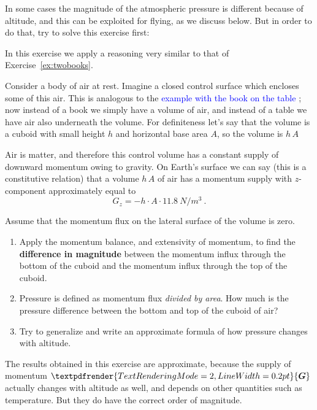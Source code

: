 \documentclass[a4paper,12pt,%
onecolumn,oneside,%
british%
]{memoir}
\renewcommand*{\bm}[1]{\textpdfrender{TextRenderingMode=2,LineWidth=0.2pt}{\boldsymbol{#1}}}
\renewcommand*{\|}[1][]{\nonscript\:#1\vert\nonscript\:\mathopen{}}
\newcommand*{\sect}{\S}%
\renewcommand*{\autoref}[3][\sect\,\ref]{\textcolor{blue}{#3}
\raisebox{0.6ex}{\color{blue}\miniscule%
\faIcon{angle-right}%
\;#1{#2}\;p.\,\pageref{#2}}}
\newcommand*{\yG}{\bm{G}}
\begin{document}
In some cases the magnitude of the atmospheric pressure is different because of altitude, and this can be exploited for flying, as we discuss below. But in order to do that, try to solve this exercise first:
\begin{exercise}[label={ex:atmosphericpressure}]
  In this exercise we apply a reasoning very similar to that of Exercise~\ref{ex:twobooks}.

  Consider a body of air at rest. Imagine a closed control surface which encloses some of this air. This is analogous to the \autoref{sec:bal_momentum_statics}{example with the book on the table}; now instead of a book we simply have a volume of air, and instead of a table we have air also underneath the volume. For definiteness let's say that the volume is a cuboid with small height $h$ and horizontal base area $A$, so the volume is $h\,A$

  Air is matter, and therefore this control volume has a constant supply of downward momentum owing to gravity. On Earth's surface we can say (this is a constitutive relation) that a volume $h\,A$ of air has a momentum supply with $z$-component approximately equal to
  \begin{equation*}
    G_{z} = -h\cdot A \cdot \qty{11.8}{N/m^{3}}\ .
  \end{equation*}

  Assume that the momentum flux on the lateral surface of the volume is zero.
  \begin{enumerate}[exerc]
  \item Apply the momentum balance, and extensivity of momentum, to find the \textbf{difference in magnitude} between the momentum influx through the bottom of the cuboid and the momentum influx through the top of the cuboid.
    \item Pressure is defined as momentum flux \emph{divided by area}. How much is the pressure difference between the bottom and top of the cuboid of air?
    \item Try to generalize and write an approximate formula of how pressure changes with altitude.
    \end{enumerate}

    {\color{red}\footnotesize{}\enskip The results obtained in this exercise are approximate, because the supply of momentum $\yG$ actually changes with altitude as well, and depends on other quantities such as temperature. But they do have the correct order of magnitude.\par}
\end{exercise}
\end{document}
